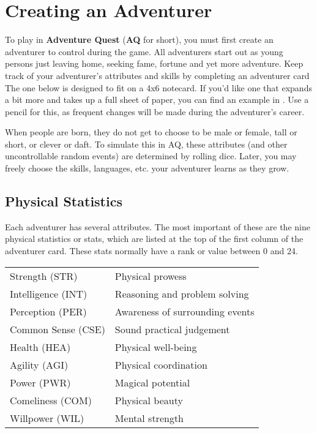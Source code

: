 \chapter{Creating an Adventurer}
To play in \textbf{Adventure Quest} (\textbf{AQ} for short), you must first create an adventurer to control during the game. All adventurers start out as young persons just leaving home, seeking fame, fortune and yet more adventure. Keep track of your adventurer's attributes and skills by completing an adventurer card The one below is designed to fit on a 4x6 notecard. If you'd like one that expands a bit more and takes up a full sheet of paper, you can find an example in . Use a pencil for this, as frequent changes will be made during the adventurer's career.

\smallskip

When people are born, they do not get to choose to be male or female, tall or short, or clever or daft. To simulate this in AQ, these attributes (and other uncontrollable random events) are determined by rolling dice. Later, you may freely choose the skills, languages, etc. your adventurer learns as they grow. 
\section{Physical Statistics}

Each adventurer has several attributes. The most important of these are the nine physical statistics or stats, which are listed at the top of the first column of the adventurer card. These stats normally have a rank or value between 0 and 24.

\noindent\begin{normbox}
\small
\begin{tabular}{@{}l l}
Strength (STR) & Physical prowess\\
Intelligence (INT) & Reasoning and problem solving\\
Perception (PER) & Awareness of surrounding events\\
Common Sense (CSE) & Sound practical judgement\\
Health (HEA) & Physical well-being\\
Agility (AGI) & Physical coordination\\
Power  (PWR) &  Magical potential\\
Comeliness (COM) & Physical beauty\\
Willpower (WIL) & Mental strength\\
\end{tabular}
\normalsize
\end{normbox}

